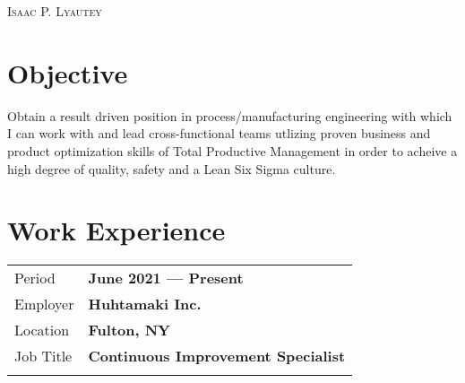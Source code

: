 \documentclass[a4paper, oneside, final, 10pt]{scrartcl} %
\newcommand{\gray}{\rowcolor[gray]{.90}} %
\begin{document}

\begin{center} %


{\fontsize{36}{36}\selectfont\scshape Isaac P. Lyautey}


\section{Objective}
\begin{center}
    Obtain a result driven position in process/manufacturing engineering with which I can work with and lead cross-functional teams utlizing proven business and product optimization skills of Total Productive Management in order to acheive a high degree of quality, safety and a Lean Six Sigma culture.
\end{center}



\section{Work Experience}

\begin{tabularx}{0.97\linewidth}{XX}
    \gray{}Period    & \textbf{June 2021 --- Present}                    \\
    \gray{}Employer  & \textbf{Huhtamaki Inc.}                    \\
    \gray{}Location  & \textbf{Fulton, NY}                        \\
    \gray{}Job Title & \textbf{Continuous Improvement Specialist} \\
    \vspace{-10pt}
\end{tabularx}


\end{center}
\end{document}
